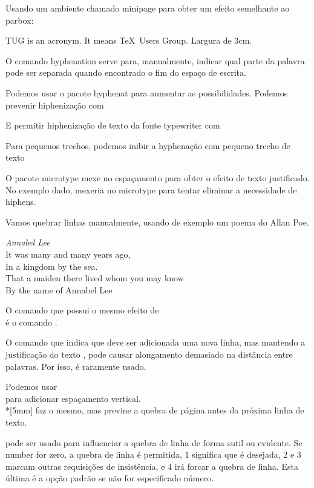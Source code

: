 \documentclass{article}
\begin{document}

Usando um ambiente chamado minipage para obter um efeito semelhante ao parbox:

\begin{minipage}{3cm}

    TUG is an acronym. It means \TeX\ Users Group. Largura de 3cm.

\end{minipage}

O comando hyphenation serve para, manualmente, indicar qual parte da palavra pode ser separada quando encontrado o fim do espaço de escrita.

Podemos usar o pacote hyphenat para aumentar as possibilidades.
Podemos prevenir hiphenização com
\usepackage[none]{hyphenat}
E permitir hiphenização de texto da fonte typewriter com
\usepackage[htt]{hyphenat}

Para pequenos trechos, podemos inibir a hyphenação com \nohyphens{pequeno trecho de texto}

O pacote microtype mexe no espaçamento para obter o efeito de texto justificado.
No exemplo dado, mexeria no microtype para tentar eliminar a necessidade de hiphens.

Vamos quebrar linhas manualmente, usando de exemplo um poema do Allan Poe.

\emph{Annabel Lee} \\[3mm]
It was many and many years ago, \\
In a kingdom by the sea. \\
That a maiden there lived whom you may know \\
By the name of Annabel Lee

O comando que possui o mesmo efeito de \\
é o comando \newline.

O comando que indica que deve ser adicionada uma nova linha,
mas mantendo a justificação do texto \linebreak, pode causar
alongamento demasiado na distância entre palavras.
Por isso, é raramente usado.

Podemos usar \\[3mm] para adicionar espaçamento vertical.
\\*[5mm] faz o mesmo, mas previne a quebra de página antes da
próxima linha de texto.

\linebreak[number] pode ser usado para influenciar a quebra de linha de forma sutil ou evidente.
Se number for zero, a quebra de linha é permitida, 1 significa que é desejada, 2 e 3 marcam outras requisições de insistência, e 4 irá forcar a quebra de linha.
Esta última é a opção padrão se não for especificado número.
\end{document}
